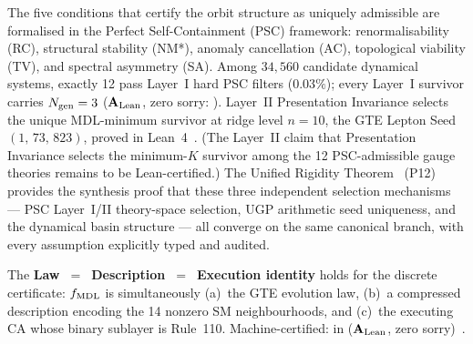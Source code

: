 The five conditions that certify the orbit structure as uniquely admissible are
formalised in the Perfect Self-Containment (PSC) framework: renormalisability (RC),
structural stability (NM*), anomaly cancellation (AC), topological viability (TV),
and spectral asymmetry (SA).  Among $34{,}560$ candidate dynamical systems, exactly
12 pass Layer~I hard PSC filters ($0.03\%$); every Layer~I survivor carries
$N_{\rm gen}=3$ ($\textbf{A}_{\rm Lean}$, zero sorry:
).  Layer~II Presentation Invariance selects
the unique MDL-minimum survivor at ridge level $n{=}10$, the GTE Lepton Seed
$(1,\,73,\,823)$, proved in
Lean~4~\cite{SpivackPSCConcordance,SpivackCompUniversality,SpivackGTEUnification}.
(The Layer~II claim that Presentation Invariance selects the minimum-$K$ survivor
among the 12 PSC-admissible gauge theories remains to be Lean-certified.)
The Unified Rigidity Theorem~\cite{SpivackUnifiedRigidity} (P12) provides the
synthesis proof that these three independent selection mechanisms --- PSC Layer~I/II
theory-space selection, UGP arithmetic seed uniqueness, and the dynamical basin
structure --- all converge on the same canonical branch, with every assumption
explicitly typed and audited.

The \textbf{Law~$=$~Description~$=$~Execution identity} holds for the discrete
certificate: $f_{\rm MDL}$ is simultaneously (a)~the GTE evolution law,
(b)~a compressed description encoding the 14 nonzero SM neighbourhoods, and
(c)~the executing CA whose binary sublayer is Rule~110.  Machine-certified:
 in
 ($\mathbf{A}_{\rm Lean}$, zero sorry)~\cite{SpivackReflexiveLaw}.

